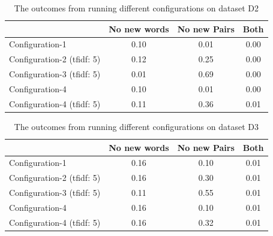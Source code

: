 \begin{center}
\begin{table}
  \begin{tabular}{|l|c|c|c|}
    \hline
    &  No new words & No new Pairs & Both \\ \hline
    Configuration-1                    & 0.10  & 0.01  & 0.00 \\ \hline
    Configuration-2 (tfidf: 5)         & 0.12  & 0.25  & 0.00 \\ \hline
    Configuration-3 (tfidf: 5)         & 0.01  & 0.69  & 0.00 \\ \hline
    Configuration-4                    & 0.10  & 0.01  & 0.00 \\ \hline
    Configuration-4 (tfidf: 5)         & 0.11  & 0.36  & 0.01 \\ \hline
  \end{tabular}
  \caption{The outcomes from running different configurations on dataset D2}
  \label{tab:d2}
\end{table}
\end{center}

\begin{center}
\begin{table}
  \begin{tabular}{|l|c|c|c|}
    \hline
    &  No new words & No new Pairs & Both \\ \hline
    Configuration-1                    & 0.16  & 0.10  & 0.01 \\ \hline
    Configuration-2 (tfidf: 5)         & 0.16  & 0.30  & 0.01 \\ \hline
    Configuration-3 (tfidf: 5)         & 0.11  & 0.55  & 0.01 \\ \hline
    Configuration-4                    & 0.16  & 0.10  & 0.01 \\ \hline
    Configuration-4 (tfidf: 5)         & 0.16  & 0.32  & 0.01 \\ \hline
  \end{tabular}
  \caption{The outcomes from running different configurations on dataset D3}
  \label{tab:d3}
\end{table}
\end{center}

